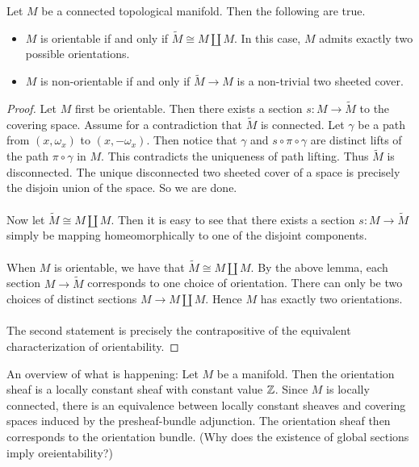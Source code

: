 \documentclass[a4paper]{article}
\begin{document}
\begin{thm}{}{} Let $M$ be a connected topological manifold. Then the following are true. 
\begin{itemize}
\item $M$ is orientable if and only if $\widetilde{M}\cong M\amalg M$. In this case, $M$ admits exactly two possible orientations. 
\item $M$ is non-orientable if and only if $\widetilde{M}\to M$ is a non-trivial two sheeted cover. 
\end{itemize} \tcbline
\begin{proof}
Let $M$ first be orientable. Then there exists a section $s:M\to\widetilde{M}$ to the covering space. Assume for a contradiction that $\widetilde{M}$ is connected. Let $\gamma$ be a path from $(x,\omega_x)$ to $(x,-\omega_x)$. Then notice that $\gamma$ and $s\circ\pi\circ\gamma$ are distinct lifts of the path $\pi\circ\gamma$ in $M$. This contradicts the uniqueness of path lifting. Thus $\widetilde{M}$ is disconnected. The unique disconnected two sheeted cover of a space is precisely the disjoin union of the space. So we are done. \\~\\

Now let $\widetilde{M}\cong M\amalg M$. Then it is easy to see that there exists a section $s:M\to\widetilde{M}$ simply be mapping homeomorphically to one of the disjoint components. \\~\\

When $M$ is orientable, we have that $\widetilde{M}\cong M\amalg M$. By the above lemma, each section $M\to\widetilde{M}$ corresponds to one choice of orientation. There can only be two choices of distinct sections $M\to M\amalg M$. Hence $M$ has exactly two orientations. \\~\\

The second statement is precisely the contrapositive of the equivalent characterization of orientability. 
\end{proof}
\end{thm}

An overview of what is happening: Let $M$ be a manifold. Then the orientation sheaf is a locally constant sheaf with constant value $\mathbb{Z}$. Since $M$ is locally connected, there is an equivalence between locally constant sheaves and covering spaces induced by the presheaf-bundle adjunction. The orientation sheaf then corresponds to the orientation bundle. (Why does the existence of global sections imply oreientability?)
\end{document}
